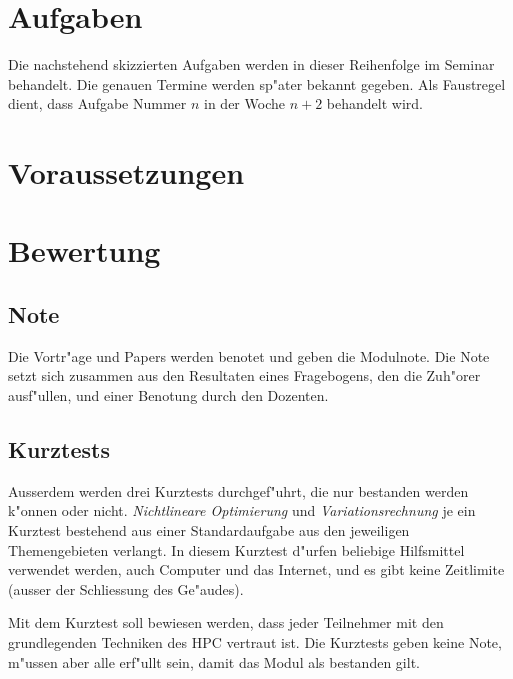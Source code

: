 \documentclass[a4paper,12pt]{article}
\begin{document}
\section{Aufgaben}
Die nachstehend skizzierten Aufgaben werden in dieser Reihenfolge im
Seminar behandelt. Die genauen Termine werden sp"ater bekannt
gegeben. Als Faustregel dient, dass Aufgabe Nummer $n$ in der Woche
$n + 2$ behandelt wird.

\newtheorem{aufgabe}{Aufgabe}

\section{Voraussetzungen}

\section{Bewertung}
\subsection{Note}
Die Vortr"age und Papers werden benotet und geben die Modulnote.
Die Note setzt sich zusammen aus den Resultaten eines Fragebogens,
den die Zuh"orer ausf"ullen, und einer Benotung durch den Dozenten.

\subsection{Kurztests}
Ausserdem werden drei Kurztests durchgef"uhrt, die nur bestanden
werden k"onnen oder nicht. 
{\em Nichtlineare Optimierung} und {\em Variationsrechnung} je
ein Kurztest bestehend aus einer Standardaufgabe aus den jeweiligen
Themengebieten verlangt. In diesem Kurztest d"urfen beliebige Hilfsmittel
verwendet werden, auch Computer und das Internet, und es gibt keine
Zeitlimite (ausser der Schliessung des Ge"audes).

Mit dem Kurztest
soll bewiesen werden, dass jeder Teilnehmer mit den grundlegenden
Techniken des HPC vertraut ist.
Die Kurztests geben keine Note, m"ussen aber alle erf"ullt sein,
damit das Modul als bestanden gilt.
\end{document}
